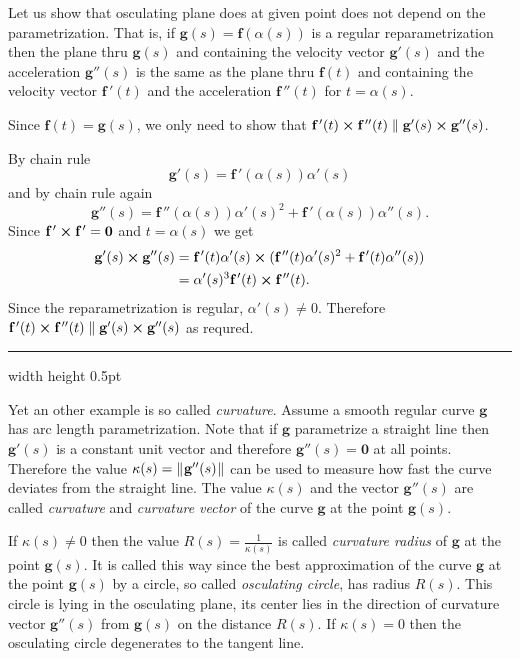 \begin{exmp} Let us show that osculating plane does at given point does not depend on the parametrization.
That is, if $\textbf{g}(s)=\textbf{f}(\alpha(s))$ is a regular reparametrization then 
the plane thru $\textbf{g}(s)$ and containing the velocity vector $\textbf{g}'(s)$ and the acceleration $\textbf{g}''(s)$
is the same as  
the plane thru $\textbf{f}(t)$ and containing the velocity vector $\textbf{f}\,'(t)$ and the acceleration $\textbf{f}\,''(t)$
for $t=\alpha(s)$.

Since $\textbf{f}(t)=\textbf{g}(s)$, 
we only need to show that
$\textbf{f}\,'(t) \bm{\times} \textbf{f}\,''(t)\parallel\textbf{g}'(s) \bm{\times} \textbf{g}''(s)$.

By chain rule
\[\textbf{g}'(s)=\textbf{f}\,'(\alpha(s))\alpha'(s)\] 
and by chain rule again
\[\textbf{g}''(s)=\textbf{f}\,''(\alpha(s))\alpha'(s)^2+\textbf{f}\,'(\alpha(s))\alpha''(s).\] 
Since $\textbf{f}\,' \bm{\times} \textbf{f}\,'=\textbf{0}$ and $t=\alpha(s)$ we get
\begin{align*}
\textbf{g}'(s) \bm{\times} \textbf{g}''(s)
&
=\textbf{f}\,'(t)\alpha'(s) \bm{\times} (\textbf{f}\,''(t)\alpha'(s)^2+\textbf{f}\,'(t)\alpha''(s))
\\
&=
\alpha'(s)^3\textbf{f}\,'(t) \bm{\times} \textbf{f}\,''(t).
\end{align*}
Since the reparametrization is regular, $\alpha'(s)\ne0$.
Therefore $\textbf{f}\,'(t) \bm{\times} \textbf{f}\,''(t)\parallel\textbf{g}'(s) \bm{\times} \textbf{g}''(s)$ as requred.
\end{exmp}
\hrule width \textwidth height 0.5pt
\vspace{3mm}

Yet an other example is so called \emph{curvature}. 
Assume a smooth regular curve $\textbf{g}$ has arc length parametrization.
Note that if $\textbf{g}$ para\-met\-rize a straight line 
then $\textbf{g}'(s)$ is a constant unit vector and therefore $\textbf{g}''(s)=\textbf{0}$ at all points.
Therefore the value $\kappa(s)=\lVert\mspace{1mu}\textbf{g}''(s)\mspace{1mu}\rVert$ can be used to measure how fast the curve deviates from the straight line.
The value $\kappa(s)$ and the vector $\textbf{g}''(s)$ are called \emph{curvature} and \emph{curvature vector} of the curve $\textbf{g}$ at the point $\textbf{g}(s)$.

If $\kappa(s)\ne 0$ then the value $R(s)=\tfrac1{\kappa(s)}$
is called \emph{curvature radius} of $\textbf{g}$ at the point $\textbf{g}(s)$. 
It is called this way since the best approximation of the curve $\textbf{g}$ at the point $\textbf{g}(s)$ by a circle, so called \emph{osculating circle}, has radius $R(s)$.
This circle is lying in the osculating plane,
its center lies in the direction of curvature vector $\textbf{g}''(s)$ from $\textbf{g}(s)$ on the distance $R(s)$.
If $\kappa(s)=0$ then the osculating circle degenerates to the tangent line.

